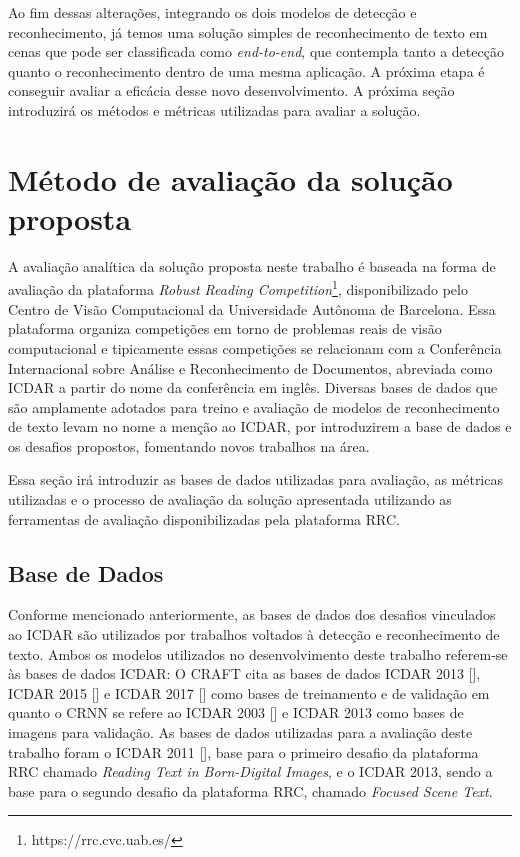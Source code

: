 Ao fim dessas alterações, integrando os dois modelos de detecção e reconhecimento, já temos uma solução simples de reconhecimento de texto em cenas 
que pode ser classificada como \textit{end-to-end}, que contempla tanto a detecção quanto o reconhecimento dentro de uma mesma aplicação. A próxima 
etapa é conseguir avaliar a eficácia desse novo desenvolvimento. A próxima seção introduzirá os métodos e métricas utilizadas para avaliar a solução.

\section{Método de avaliação da solução proposta}\label{sec:methodology_validation}

A avaliação analítica da solução proposta neste trabalho é baseada na forma de avaliação da plataforma \textit{Robust Reading Competition}\footnote{https://rrc.cvc.uab.es/}, 
disponibilizado pelo Centro de Visão Computacional da Universidade Autônoma de Barcelona. Essa plataforma organiza competições em torno de 
problemas reais de visão computacional e tipicamente essas competições se relacionam com a Conferência Internacional sobre Análise e Reconhecimento 
de Documentos, abreviada como ICDAR a partir do nome da conferência em inglês. Diversas bases de dados que são amplamente adotados para 
treino e avaliação de modelos de reconhecimento de texto levam no nome a menção ao ICDAR, por introduzirem a base de dados e os desafios 
propostos, fomentando novos trabalhos na área.

Essa seção irá introduzir as bases de dados utilizadas para avaliação, as métricas utilizadas e o processo de avaliação da solução apresentada 
utilizando as ferramentas de avaliação disponibilizadas pela plataforma RRC.

\subsection{Base de Dados}\label{sec:methodology_datasets}

Conforme mencionado anteriormente, as bases de dados dos desafios vinculados ao ICDAR são utilizados por trabalhos voltados à detecção e 
reconhecimento de texto. Ambos os modelos utilizados no desenvolvimento deste trabalho referem-se às bases de dados ICDAR: O CRAFT cita as bases 
de dados ICDAR 2013 [], ICDAR 2015 [] e ICDAR 2017 [] como bases de treinamento 
e de validação em quanto o CRNN se refere ao ICDAR 2003 [] e ICDAR 2013 como bases de imagens para validação. As bases de 
dados utilizadas para a avaliação deste trabalho foram o ICDAR 2011 [], base para o primeiro desafio da plataforma RRC 
chamado \textit{Reading Text in Born-Digital Images}, e o ICDAR 2013, sendo a base para o segundo desafio da plataforma RRC, chamado \textit{Focused Scene Text}.

